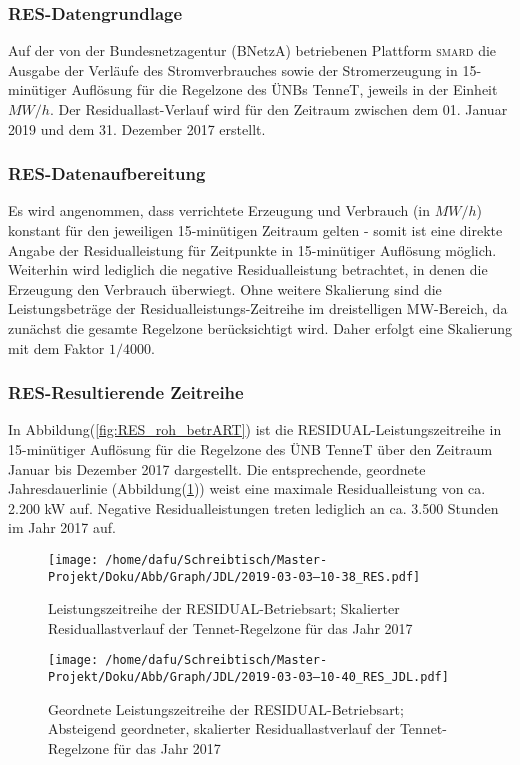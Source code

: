 \documentclass[onecolumn,10pt,titlepage]{article}
\begin{document}
\subsubsection{RES-Datengrundlage}
Auf der von der Bundesnetzagentur (BNetzA) betriebenen Plattform \textsc{smard}
die Ausgabe der Verläufe des Stromverbrauches sowie der Stromerzeugung in 15-minütiger Auflösung für die Regelzone des ÜNBs TenneT, jeweils in der Einheit $MW/h$. Der Residuallast-Verlauf wird für den Zeitraum zwischen dem 01. Januar 2019 und dem 31. Dezember 2017 erstellt.
\subsubsection{RES-Datenaufbereitung}
Es wird angenommen, dass verrichtete Erzeugung und Verbrauch (in $MW/h$) konstant für den jeweiligen 15-minütigen Zeitraum gelten - somit ist eine direkte Angabe der Residualleistung für Zeitpunkte in 15-minütiger Auflösung möglich. Weiterhin wird lediglich die negative Residualleistung betrachtet, in denen die Erzeugung den Verbrauch überwiegt.
Ohne weitere Skalierung sind die Leistungsbeträge der Residualleistungs-Zeitreihe im dreistelligen MW-Bereich, da zunächst die gesamte Regelzone berücksichtigt wird. Daher erfolgt eine Skalierung mit dem Faktor $1/4000$.
\subsubsection{RES-Resultierende Zeitreihe}

In Abbildung(\ref{fig:RES_roh_betrART}) ist die RESIDUAL-Leistungszeitreihe in 15-minütiger Auflösung für die Regelzone des ÜNB TenneT über den Zeitraum Januar bis Dezember 2017 dargestellt. Die entsprechende, geordnete Jahresdauerlinie (Abbildung(\ref{fig:RES_JDL_betrART})) weist eine maximale Residualleistung von  ca. 2.200 kW auf. Negative Residualleistungen treten lediglich an ca. 3.500 Stunden im Jahr 2017 auf.\\
\begin{figure}[H]
	\centering
	\begin{minipage}[t]{0.49\textwidth}
		\texttt{[image: /home/dafu/Schreibtisch/Master-Projekt/Doku/Abb/Graph/JDL/2019-03-03--10-38\_RES.pdf]}

		\caption[Leistungszeitreihe der RESIDUAL-Betriebsart]{Leistungszeitreihe der RESIDUAL-Betriebsart; Skalierter Residuallastverlauf der Tennet-Regelzone für das Jahr 2017}
		\label{fig:RES_roh_betrART}
	\end{minipage}
	\hfill
	\begin{minipage}[t]{0.49\textwidth}
		\texttt{[image: /home/dafu/Schreibtisch/Master-Projekt/Doku/Abb/Graph/JDL/2019-03-03--10-40\_RES\_JDL.pdf]}
		\caption[Geortnete Leistungszeitreihe der RESIDUAL-Betriebsart]{Geordnete Leistungszeitreihe der RESIDUAL-Betriebsart; Absteigend geordneter, skalierter Residuallastverlauf der Tennet-Regelzone für das Jahr 2017}
		\label{fig:RES_JDL_betrART}
	\end{minipage}
\end{figure}
\end{document}
